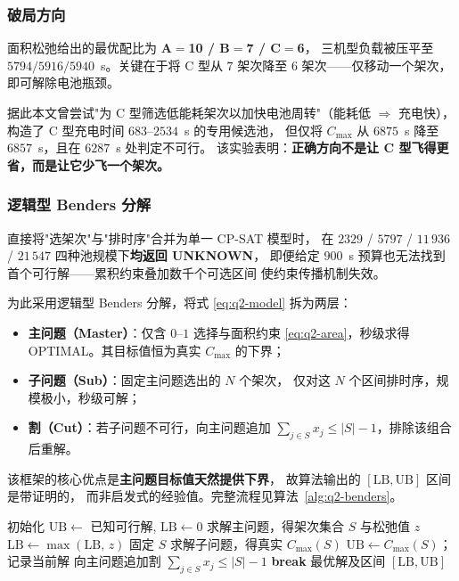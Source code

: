 \subsubsection{破局方向}

面积松弛给出的最优配比为 \textbf{A$=$10 / B$=$7 / C$=$6}，
三机型负载被压平至 $5794/5916/5940$~s。关键在于将 C 型从 $7$ 架次降至
$6$ 架次——仅移动一个架次，即可解除电池瓶颈。

据此本文曾尝试"为 C 型筛选低能耗架次以加快电池周转"（能耗低
$\Rightarrow$ 充电快），构造了 C 型充电时间 $683$--$2534$~s 的专用候选池，
但仅将 $C_{\max}$ 从 $6875$~s 降至 $6857$~s，且在 $6287$~s 处判定不可行。
该实验表明：\textbf{正确方向不是让 C 型飞得更省，而是让它少飞一个架次。}

\subsubsection{逻辑型 Benders 分解}

直接将"选架次"与"排时序"合并为单一 CP-SAT 模型时，
在 $2329$ / $5797$ / $11\,936$ / $21\,547$ 四种池规模下\textbf{均返回 UNKNOWN}，
即便给定 $900$~s 预算也无法找到首个可行解——累积约束叠加数千个可选区间
使约束传播机制失效。

为此采用逻辑型 Benders 分解，将式 \eqref{eq:q2-model} 拆为两层：

\begin{itemize}
  \item \textbf{主问题（Master）}：仅含 $0$--$1$ 选择与面积约束
        \eqref{eq:q2-area}，秒级求得 OPTIMAL。其目标值恒为真实 $C_{\max}$
        的下界；
  \item \textbf{子问题（Sub）}：固定主问题选出的 $N$ 个架次，
        仅对这 $N$ 个区间排时序，规模极小，秒级可解；
  \item \textbf{割（Cut）}：若子问题不可行，向主问题追加
        $\sum_{j\in S} x_j\le |S|-1$，排除该组合后重解。
\end{itemize}

该框架的核心优点是\textbf{主问题目标值天然提供下界}，
故算法输出的 $[\mathrm{LB},\mathrm{UB}]$ 区间是带证明的，
而非启发式的经验值。完整流程见算法~\ref{alg:q2-benders}。

\begin{algorithm}[htbp]
  \caption{逻辑型 Benders 分解求解 $\min C_{\max}$}
  \label{alg:q2-benders}
  \begin{algorithmic}[1]
    \State 初始化 $\mathrm{UB}\gets$ 已知可行解, $\mathrm{LB}\gets 0$
      \State 求解主问题，得架次集合 $S$ 与松弛值 $z$
      \State $\mathrm{LB}\gets\max(\mathrm{LB},\,z)$
      \State 固定 $S$ 求解子问题，得真实 $C_{\max}(S)$
        \State $\mathrm{UB}\gets C_{\max}(S)$；记录当前解
      \EndIf
      \State 向主问题追加割 $\sum_{j\in S}x_j\le|S|-1$
        \State \textbf{break}
      \EndIf
    \EndFor
    \State \Return 最优解及区间 $[\mathrm{LB},\mathrm{UB}]$
  \end{algorithmic}
\end{algorithm}


